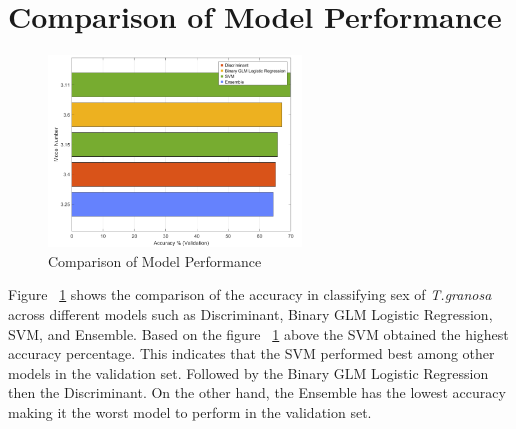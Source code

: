\begin{table}[H]
	\centering
	{\fontsize{8}{10}\selectfont 
	}
	\caption{ Descriptive statistics of the \Tgranosa features}
	\label{tab:descriptive-stat}
\end{table}


\section{Comparison of Model Performance}
\begin{figure}[!htbp]
	\centering
	\includegraphics[width=0.6\textwidth]{figures/compare-models.png}
	\caption{Comparison of Model Performance}
	\label{fig:compare-models}
\end{figure}

Figure ~\ref{fig:compare-models} shows the comparison of the accuracy in classifying sex of \textit{T.granosa} across different models such as Discriminant, Binary GLM Logistic Regression, SVM, and Ensemble. Based on the figure ~\ref{fig:compare-models} above the SVM obtained the highest accuracy percentage. This indicates that the SVM performed best among other models in the validation set. Followed by the Binary GLM Logistic Regression then the Discriminant. On the other hand, the Ensemble has the lowest accuracy making it the worst model to perform in the validation set. 


